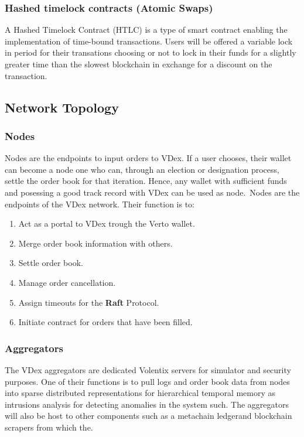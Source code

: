 \documentclass[]{article}
\begin{document}
	\subsubsection{Hashed timelock contracts (Atomic Swaps)}
	A Hashed Timelock Contract (HTLC)\cite{22} is a type of smart contract enabling the implementation of time-bound transactions.
	Users will be offered a variable lock in period for their transations choosing or not
	to lock in their funds for a slightly greater time than the slowest blockchain in exchange for a discount on the transaction.
	
	\subsection{Network Topology}
	\subsubsection{Nodes}
	Nodes are the endpoints to input orders to VDex. If a user chooses, their wallet can become a node one who can, 
	through an election or designation process, settle the order book for that iteration.   
	Hence, any wallet with sufficient funds and posessing a good track record with VDex can be used as node.\
	Nodes are the endpoints of the VDex network.
	Their function is to:\
	\begin{enumerate}
		\item Act as a portal to VDex trough the Verto wallet.
		\item Merge order book information with others.
		\item Settle order book.\
		\item Manage order cancellation.\
		\item Assign timeouts for the \textbf{Raft} Protocol.\
		\item Initiate contract for orders that have been filled.
	\end{enumerate}
	
	\subsubsection{Aggregators}
	
	The VDex aggregators are dedicated Volentix servers for simulator and security purposes. 
	One of their functions is to pull logs and order book data from nodes into sparse distributed representations for hierarchical temporal memory
	as intrusions \cite{24} analysis for detecting anomalies in the system such. 
	The aggregators will also be host to other components such as a metachain  ledger\cite{20}and blockchain scrapers from which the.
	 
\end{document}
